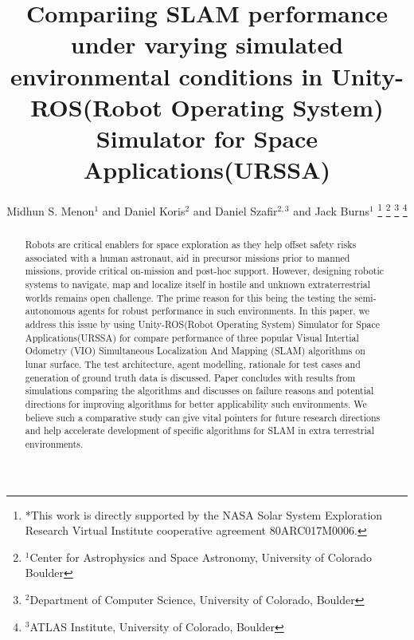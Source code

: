 \documentclass[a4paper, 10pt, conference]{ieeeconf}      %
\title{\LARGE \bf
Compariing SLAM performance under varying simulated environmental conditions in Unity-ROS(Robot Operating System) Simulator for Space Applications(URSSA)
}
\author{Midhun S. Menon$^{1}$ and Daniel Koris$^{2}$ and Daniel Szafir$^{2,3}$ and Jack Burns$^{1}$%
\thanks{*This work is directly supported by the NASA Solar System Exploration Research Virtual Institute cooperative agreement 80ARC017M0006.}%
\thanks{$^{1}$Center for Astrophysics and Space Astronomy, University of Colorado Boulder}%
\thanks{$^{2}$Department of Computer Science, University of Colorado, Boulder}%
\thanks{$^{3}$ATLAS Institute, University of Colorado, Boulder}%
}
\begin{document}

\thispagestyle{empty}
\pagestyle{empty}


\begin{abstract}
Robots are critical enablers for space exploration as they help offset safety risks associated with a human astronaut, aid in precursor missions prior to manned missions, provide critical on-mission and post-hoc support. However, designing robotic systems to navigate, map and localize itself in hostile and unknown extraterrestrial worlds remains open challenge. The prime reason for this being the testing the semi-autonomous agents  for robust performance in such environments. In this paper, we address this issue by using Unity-ROS(Robot Operating System) Simulator for Space Applications(URSSA) for compare performance of three popular Visual Intertial Odometry (VIO) Simultaneous Localization And Mapping (SLAM) algorithms on lunar surface. The test architecture, agent modelling, rationale for test cases and generation of ground truth data is discussed. Paper concludes with results from simulations comparing the algorithms and discusses on failure reasons and potential directions for improving algorithms for better applicability such environments. We believe such a comparative study can give vital pointers for future research directions and help accelerate development of specific algorithms for SLAM in extra terrestrial environments.

\end{abstract}
\end{document}
